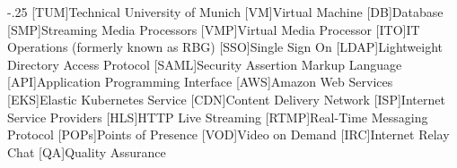 \documentclass[headsepline,footsepline,footinclude=false,oneside,fontsize=11pt,paper=a4,listof=totoc,bibliography=totoc]{scrbook} %
\begin{document}


\frontmatter{}





\tableofcontents{}

\mainmatter{}






%





\appendix{}


\begin{acronym}
	\itemsep-.25\baselineskip
	[TUM]{Technical University of Munich}
 	[VM]{Virtual Machine}
 	[DB]{Database}
 	[SMP]{Streaming Media Processors}
 	[VMP]{Virtual Media Processor}
 	[ITO]{IT Operations (formerly known as RBG)}
 	[SSO]{Single Sign On}
 	[LDAP]{Lightweight Directory Access Protocol}
 	[SAML]{Security Assertion Markup Language}
 	[API]{Application Programming Interface}
 	[AWS]{Amazon Web Services}
 	[EKS]{Elastic Kubernetes Service}
 	[CDN]{Content Delivery Network}
 	[ISP]{Internet Service Providers}
 	[HLS]{HTTP Live Streaming}
 	[RTMP]{Real-Time Messaging Protocol}
 	[POPs]{Points of Presence}
 	[VOD]{Video on Demand}
 	[IRC]{Internet Relay Chat}
 	[QA]{Quality Assurance}
\end{acronym}

\listoffigures{}
\listoftables{}
\printbibliography{}
\end{document}
